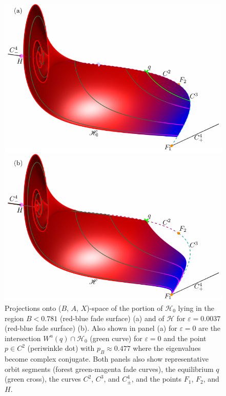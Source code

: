 \documentclass{ws-ijbc}
\begin{document}
\begin{figure}[H]
\centering
\includegraphics[]{./figures/MKMO_13.pdf}
\caption{Projections onto ($B$, $A$, $X$)-space of the portion of $\mathscr{H}_0$ lying in the region $B < 0.781$ (red-blue fade surface) (a) and of $\mathscr{H}$ for $\varepsilon=0.0037$ (red-blue fade surface) (b).   Also shown in panel (a) for $\varepsilon=0$ are the intersection $W^u(q)\cap\mathscr{H}_0$ (green curve) for $\varepsilon=0$ and the point $p \in C^2$ (periwinkle dot) with $p_B \approx 0.477$ where the eigenvalues become complex conjugate.   Both panels also show representative orbit segments (forest green-magenta fade curves), the equilibrium $q$ (green cross), the curves $C^2$, $C^3$, and $C^4_\pm$, and the points $F_1$, $F_2$, and $H$.}
\label{figure_13}
\end{figure}
\end{document}
